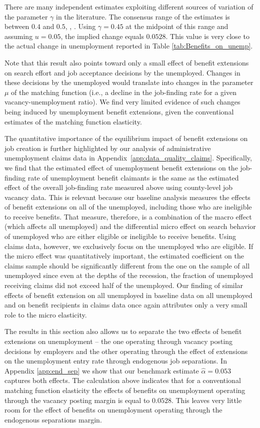 \documentclass[12pt]{article}
\newcommand{\1}{\mathbf{1}}
\begin{document}
There are many independent estimates exploiting different sources of variation of the parameter $\gamma$ in the literature. The consensus range of the estimates is between $0.4$ and $0.5$, \citet{brugemann:08}, \citet{petrongolo_pissarides:01}. Using $\gamma = 0.45$ at the midpoint of this range and assuming $u = 0.05$, the implied change equals $0.0528$. This value is very close to the actual change in unemployment reported in Table \ref{tab:Benefits_on_unemp}.

Note that this result also points toward only a small effect of benefit extensions on search effort and job acceptance decisions by the unemployed. Changes in these decisions by the unemployed would translate into changes in the parameter $\mu$ of the matching function (i.e., a decline in the job-finding rate for a given vacancy-unemployment ratio). We find very limited evidence of such changes being induced by unemployment benefit extensions, given the conventional estimates of the matching function elasticity.

The quantitative importance of the equilibrium impact of benefit extensions on job creation is further highlighted by our analysis of administrative unemployment claims data in Appendix~\ref{app:data_quality_claims}. Specifically, we find that the estimated effect of unemployment benefit extensions on the job-finding rate of unemployment benefit claimants is the same as the estimated effect of the overall job-finding rate measured above using county-level job vacancy data. This is relevant because our baseline analysis measures the effects of benefit extensions on all of the unemployed, including those who are ineligible to receive benefits. That measure, therefore, is a combination of the macro effect (which affects all unemployed) and the differential micro effect on search behavior of unemployed who are either eligible or ineligible to receive benefits. Using claims data, however, we exclusively focus on the unemployed who are eligible. If the micro effect was quantitatively important, the estimated coefficient on the claims sample should be significantly different from the one on the sample of all unemployed since even at the depths of the recession, the fraction of unemployed receiving claims did not exceed half of the unemployed. Our finding of similar effects of benefit extension on all unemployed in baseline data on all unemployed and on benefit recipients in claims data once again attributes only a very small role to the micro elasticity.

The results in this section also allows us to separate the two effects of benefit extensions on unemployment -- the one operating through vacancy posting decisions by employers and the other operating through the effect of extensions on the unemployment entry rate through endogenous job separations. In Appendix \ref{app:end_sep} we show that our benchmark estimate $\hat{\alpha}=0.053$ captures both effects. The calculation above indicates that for a conventional matching function elasticity the effects of benefits on unemployment operating through the vacancy posting margin is equal to $0.0528$. This leaves very little room for the effect of benefits on unemployment operating through the endogenous separations margin.
\end{document}
